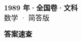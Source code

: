 \documentclass[zihao=-4, a4paper]{ctexart}
\begin{document}
\begin{center}
  {\Large\bfseries 1989 年·全国卷·文科}\\[4pt]
  {\large 数学 · 简答版}
\end{center}
\medskip
{}

\clearpage
{}
\begin{center}{\Large\bfseries 答案速查}\end{center}
\medskip

\end{document}
